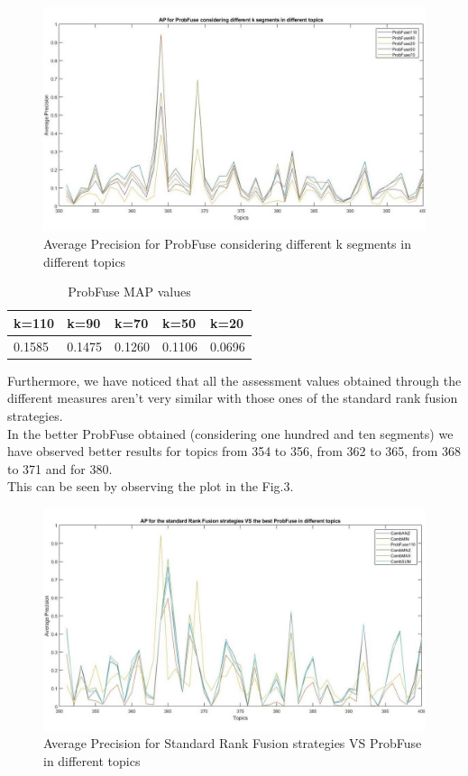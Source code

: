 \documentclass[12pt,journal]{IEEEtran}
\begin{document}
\begin{figure}
\includegraphics[scale=0.32]{plot4}
\caption{Average Precision for ProbFuse considering different k segments in different topics}
\label{Average Precision for ProbFuse considering different k segments in different topics}
\end{figure}

\begin{table}[h!]
\centering
\caption{ProbFuse MAP values}
\begin{tabular}{|l|l|l|l|l|}
\hline
k=110 & k=90 & k=70 & k=50 & k=20\\ \hline
 0.1585 & 0.1475 & 0.1260 & 0.1106  & 0.0696\\ \hline
\end{tabular}
\end{table}

Furthermore, we have noticed that all the assessment values obtained through the different measures aren’t very similar with those ones of the standard rank fusion strategies. \\
In the better ProbFuse obtained (considering one hundred and ten segments) we have observed better results for topics from 354 to 356, from 362 to 365, from 368 to 371 and for 380. \\ This can be seen by observing the plot in the Fig.3.

\begin{figure}
\includegraphics[scale=0.32]{plot2}
\caption{Average Precision for Standard Rank Fusion strategies VS ProbFuse in different topics}
\label{Average Precision for Standard Rank Fusion strategies VS ProbFuse in different topics}
\end{figure}
\end{document}
